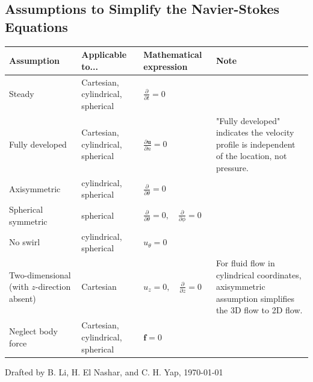 \documentclass[a4paper]{article}
\begin{document}
\subsection{Assumptions to Simplify the Navier-Stokes Equations}

\begin{table}[H]
    \centering
    \begin{tabularx}{\textwidth}{m{} m{} m{} m{}}
        \toprule
        \textbf{Assumption} & \textbf{Applicable to...} & \textbf{Mathematical expression} & \textbf{Note} \\ 
        \midrule
        Steady & Cartesian, cylindrical, spherical & $\frac{\partial}{\partial t} = 0$ & \\[.5cm]
        Fully developed & Cartesian, cylindrical, spherical & $\frac{\partial \mathbf{u}}{\partial n} = 0$ & "Fully developed" indicates the velocity profile is independent of the location, not pressure. \\[.5cm]
        Axisymmetric & cylindrical, spherical & $\frac{\partial}{\partial \theta} = 0$ & \\[.5cm]
        Spherical symmetric & spherical & $\frac{\partial}{\partial \theta} = 0, \quad \frac{\partial}{\partial \phi} = 0$ & \\[.5cm]
        No swirl & cylindrical, spherical & $u_{\theta} = 0$ & \\[.5cm]
        Two-dimensional (with $z$-direction absent) & Cartesian & $u_z = 0, \quad \frac{\partial}{\partial z} = 0$ & For fluid flow in cylindrical coordinates, axisymmetric assumption simplifies the 3D flow to 2D flow. \\[.5cm]
        Neglect body force & Cartesian, cylindrical, spherical & $\mathbf{f} = 0$ & \\ 
        \bottomrule
    \end{tabularx}
    \label{tab:flow_assumptions}
\end{table}
    
\vfill
{\small \color{gray}Drafted by B. Li, H. El Nashar, and C. H. Yap,  \today}
% 
\end{document}
